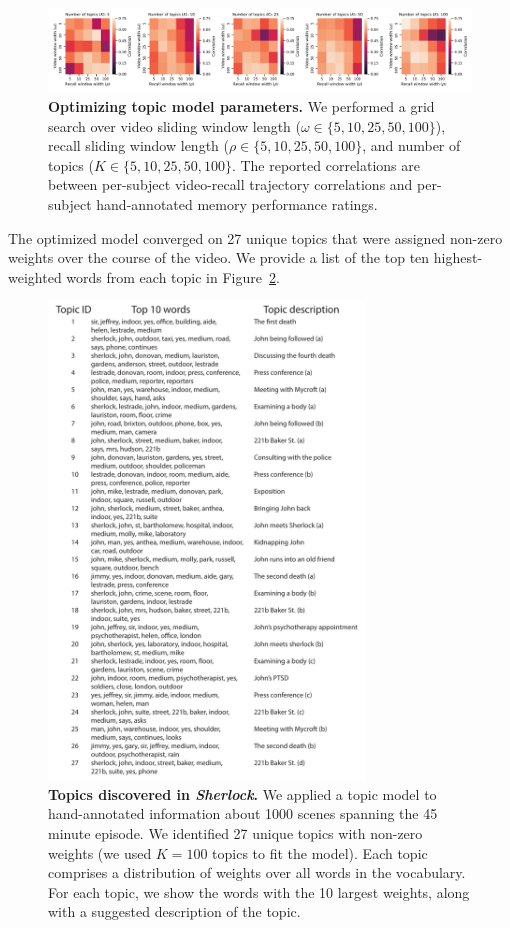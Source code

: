 \documentclass{article}
\begin{document}
\begin{figure}[p!]
\centering
\includegraphics[width=1\textwidth]{figs/parameter_search}
\caption{\small \textbf{Optimizing topic model parameters.}  We performed a grid search over video sliding window length ($\omega \in \{5, 10, 25, 50, 100 \}$), recall sliding window length ($\rho \in \{5, 10, 25, 50, 100 \}$, and number of topics ($K \in \{5, 10, 25, 50, 100 \}$.  The reported correlations are between per-subject video-recall trajectory correlations and per-subject hand-annotated memory performance ratings.}
\label{fig:paramsearch}
\end{figure}

The optimized model converged on 27 unique topics that were assigned non-zero weights over the course of the video.  We provide a list of the top ten highest-weighted words from each topic in Figure~\ref{fig:topics}.

\begin{figure}[p!]
\centering
\includegraphics[width=0.75\textwidth]{figs/topic_words}
\caption{\small \textbf{Topics discovered in \textit{Sherlock}.} We applied a topic model to hand-annotated information about 1000 scenes spanning the 45 minute episode.  We identified 27 unique topics with non-zero weights (we used $K=100$ topics to fit the model).  Each topic comprises a distribution of weights over all words in the vocabulary.  For each topic, we show the words with the 10 largest weights, along with a suggested description of the topic.}
\label{fig:topics}
\end{figure}
\end{document}

